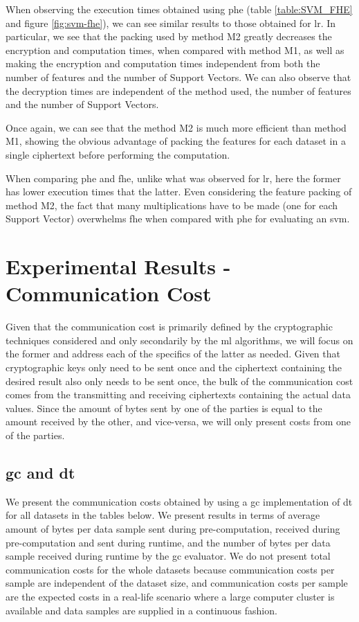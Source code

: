 When observing the execution times obtained using \ac{phe} (table \ref{table:SVM_FHE} and figure \ref{fig:svm-fhe}), we can see similar results to those obtained for \ac{lr}. In particular, we see that the packing used by method M2 greatly decreases the encryption and computation times, when compared with method M1, as well as making the encryption and computation times independent from both the number of features and the number of Support Vectors. 
We can also observe that the decryption times are independent of the method used, the number of features and the number of Support Vectors.

Once again, we can see that the method M2 is much more efficient than method M1, showing the obvious advantage of packing the features for each dataset in a single ciphertext before performing the computation.

When comparing \ac{phe} and \ac{fhe}, unlike what was observed for \ac{lr}, here the former has lower execution times that the latter. Even considering the feature packing of method M2, the fact that many multiplications have to be made (one for each Support Vector) overwhelms \ac{fhe} when compared with \ac{phe} for evaluating an \ac{svm}.


\section{Experimental Results - Communication Cost}
\label{sec:CommunicationCosts}

Given that the communication cost is primarily defined by the cryptographic techniques considered and only secondarily by the \ac{ml} algorithms, we will focus on the former and address each of the specifics of the latter as needed. Given that cryptographic keys only need to be sent once and the ciphertext containing the desired result also only needs to be sent once, the bulk of the communication cost comes from the transmitting and receiving ciphertexts containing the actual data values. Since the amount of bytes sent by one of the parties is equal to the amount received by the other, and vice-versa, we will only present costs from one of the parties.


\subsection{\acl{gc} and \acl{dt}}

We present the communication costs obtained by using a \ac{gc} implementation of \ac{dt} for all datasets in the tables below. We present results in terms of average amount of bytes per data sample sent during pre-computation, received during pre-computation and sent during runtime, and the number of bytes per data sample received during runtime by the \ac{gc} evaluator. We do not present total communication costs for the whole datasets because communication costs per sample are independent of the dataset size, and communication costs per sample are the expected costs in a real-life scenario where a large computer cluster is available and data samples are supplied in a continuous fashion.



